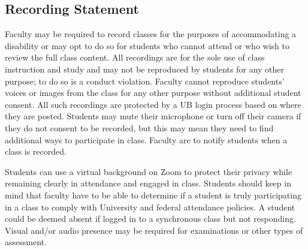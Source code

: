 \documentclass[10pt]{article}
\begin{document}
\subsection{Recording Statement}
Faculty may be required to record classes for the purposes of accommodating a disability or may opt to do so for students who cannot attend or who wish to review the full class content. All recordings are for the sole use of class instruction and study and may not be reproduced by students for any other purpose; to do so is a conduct violation. Faculty cannot reproduce students' voices or images from the class for any other purpose without additional student consent. All such recordings are protected by a UB login process based on where they are posted. Students may mute their microphone or turn off their camera if they do not consent to be recorded, but this may mean they need to find additional ways to participate in class. Faculty are to notify students when a class is recorded.

Students can use a virtual background on Zoom to protect their privacy while remaining clearly in attendance and engaged in class. Students should keep in mind that faculty have to be able to determine if a student is truly participating in a class to comply with University and federal attendance policies. A student could be deemed absent if logged in to a synchronous class but not responding. Visual and/or audio presence may be required for examinations or other types of assessment.
\end{document}
